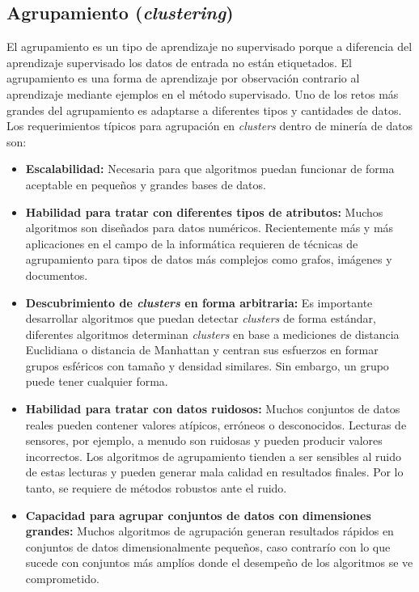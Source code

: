 \subsection{Agrupamiento (\textit{clustering})}

El agrupamiento es un tipo de aprendizaje no supervisado porque a diferencia del aprendizaje supervisado los datos de entrada no están etiquetados. El agrupamiento es una forma de aprendizaje por observación contrario al aprendizaje mediante ejemplos en el método supervisado. Uno de los retos más grandes del agrupamiento es adaptarse a diferentes tipos y cantidades de datos. Los requerimientos típicos para agrupación en \textit{clusters} dentro de minería de datos son:

\begin{itemize}
    \item \textbf{Escalabilidad:} Necesaria para que algoritmos puedan funcionar de forma aceptable en pequeños y grandes bases de datos.
    
    \item \textbf{Habilidad para tratar con diferentes tipos de atributos:} Muchos algoritmos son diseñados para datos numéricos. Recientemente más y más aplicaciones en el campo de la informática requieren de técnicas de agrupamiento para tipos de datos más complejos como grafos, imágenes y documentos.
    
    \item \textbf{Descubrimiento de \textit{clusters} en forma arbitraria:} Es importante desarrollar algoritmos que puedan detectar \textit{clusters} de forma estándar, diferentes algoritmos determinan \textit{clusters} en base a mediciones de distancia Euclidiana o distancia de Manhattan y centran sus esfuerzos en formar grupos esféricos con tamaño y densidad similares. Sin embargo, un grupo puede tener cualquier forma.
    
    \item \textbf{Habilidad para tratar con datos ruidosos:} Muchos conjuntos de datos reales pueden contener valores atípicos, erróneos o desconocidos. Lecturas de sensores, por ejemplo, a menudo son ruidosas y pueden producir valores incorrectos. Los algoritmos de agrupamiento tienden a ser sensibles al ruido de estas lecturas y pueden generar mala calidad en resultados finales. Por lo tanto, se requiere de métodos robustos ante el ruido. 
    
    \item \textbf{Capacidad para agrupar conjuntos de datos con dimensiones grandes:} Muchos algoritmos de agrupación generan resultados rápidos en conjuntos de datos dimensionalmente pequeños, caso contrarío con lo que sucede con conjuntos más amplíos donde el desempeño de los algoritmos se ve comprometido.
    

\end{itemize}
